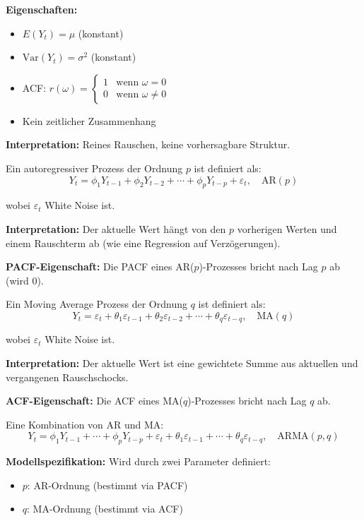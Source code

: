 \textbf{Eigenschaften:}
\begin{itemize}[leftmargin=1.5em]
    \item $E(Y_t) = \mu$ (konstant)
    \item $\text{Var}(Y_t) = \sigma^2$ (konstant)
    \item ACF: $r(\omega) = \begin{cases} 1 & \text{wenn } \omega = 0 \\ 0 & \text{wenn } \omega \neq 0 \end{cases}$
    \item Kein zeitlicher Zusammenhang
\end{itemize}

\textbf{Interpretation:} Reines Rauschen, keine vorhersagbare Struktur.

Ein autoregressiver Prozess der Ordnung $p$ ist definiert als:
$$Y_t = \phi_1 Y_{t-1} + \phi_2 Y_{t-2} + \cdots + \phi_p Y_{t-p} + \varepsilon_t, \quad \text{AR}(p)$$

wobei $\varepsilon_t$ White Noise ist.

\textbf{Interpretation:} Der aktuelle Wert hängt von den $p$ vorherigen Werten und einem Rauschterm ab (wie eine Regression auf Verzögerungen).

\textbf{PACF-Eigenschaft:} Die PACF eines AR($p$)-Prozesses bricht nach Lag $p$ ab (wird 0).

Ein Moving Average Prozess der Ordnung $q$ ist definiert als:
$$Y_t = \varepsilon_t + \theta_1 \varepsilon_{t-1} + \theta_2 \varepsilon_{t-2} + \cdots + \theta_q \varepsilon_{t-q}, \quad \text{MA}(q)$$

wobei $\varepsilon_t$ White Noise ist.

\textbf{Interpretation:} Der aktuelle Wert ist eine gewichtete Summe aus aktuellen und vergangenen Rauschschocks.

\textbf{ACF-Eigenschaft:} Die ACF eines MA($q$)-Prozesses bricht nach Lag $q$ ab.

Eine Kombination von AR und MA:
$$Y_t = \phi_1 Y_{t-1} + \cdots + \phi_p Y_{t-p} + \varepsilon_t + \theta_1 \varepsilon_{t-1} + \cdots + \theta_q \varepsilon_{t-q}, \quad \text{ARMA}(p, q)$$

\textbf{Modellspezifikation:} Wird durch zwei Parameter definiert:
\begin{itemize}[leftmargin=1.5em]
    \item $p$: AR-Ordnung (bestimmt via PACF)
    \item $q$: MA-Ordnung (bestimmt via ACF)
\end{itemize}

